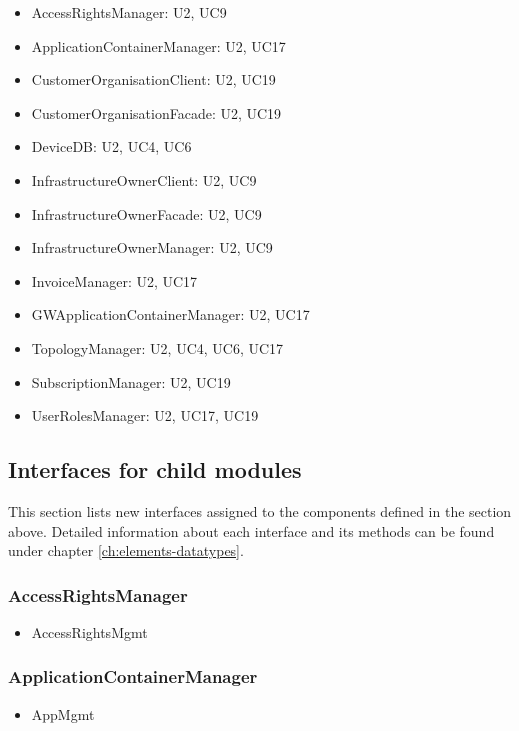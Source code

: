     \begin{itemize}
        \item AccessRightsManager: U2, UC9
        \item ApplicationContainerManager: U2, UC17
        \item CustomerOrganisationClient: U2, UC19
        \item CustomerOrganisationFacade: U2, UC19
        \item DeviceDB: U2, UC4, UC6
        \item InfrastructureOwnerClient: U2, UC9
        \item InfrastructureOwnerFacade: U2, UC9
        \item InfrastructureOwnerManager: U2, UC9
        \item InvoiceManager: U2, UC17
        \item GWApplicationContainerManager: U2, UC17
        \item TopologyManager: U2, UC4, UC6, UC17
        \item SubscriptionManager: U2, UC19
        \item UserRolesManager: U2, UC17, UC19
    \end{itemize}


\subsection{Interfaces for child modules}
    This section lists new interfaces assigned to the components defined
    in the section above. Detailed information about each interface and
    its methods can be found under chapter \ref{ch:elements-datatypes}. \\

    \subsubsection{AccessRightsManager}
        \begin{itemize}
            \item AccessRightsMgmt
        \end{itemize}

    \subsubsection{ApplicationContainerManager}
        \begin{itemize}
            \item AppMgmt
        \end{itemize}

